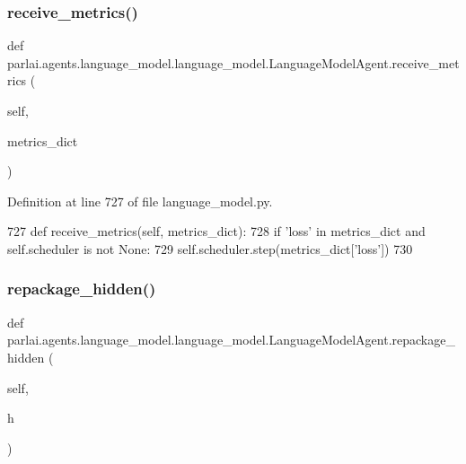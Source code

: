 \subsubsection{\texorpdfstring{receive\+\_\+metrics()}{receive\_metrics()}}
{\footnotesize\ttfamily def parlai.\+agents.\+language\+\_\+model.\+language\+\_\+model.\+Language\+Model\+Agent.\+receive\+\_\+metrics (\begin{DoxyParamCaption}\item[{}]{self,  }\item[{}]{metrics\+\_\+dict }\end{DoxyParamCaption})}



Definition at line 727 of file language\+\_\+model.\+py.


\begin{DoxyCode}
727     \textcolor{keyword}{def }receive\_metrics(self, metrics\_dict):
728         \textcolor{keywordflow}{if} \textcolor{stringliteral}{'loss'} \textcolor{keywordflow}{in} metrics\_dict \textcolor{keywordflow}{and} self.scheduler \textcolor{keywordflow}{is} \textcolor{keywordflow}{not} \textcolor{keywordtype}{None}:
729             self.scheduler.step(metrics\_dict[\textcolor{stringliteral}{'loss'}])
730 
\end{DoxyCode}
\mbox{\label{classparlai_1_1agents_1_1language__model_1_1language__model_1_1LanguageModelAgent_aa54ff09a8edc6ae51ac8be33aeb4acc8}} 
\subsubsection{\texorpdfstring{repackage\+\_\+hidden()}{repackage\_hidden()}}
{\footnotesize\ttfamily def parlai.\+agents.\+language\+\_\+model.\+language\+\_\+model.\+Language\+Model\+Agent.\+repackage\+\_\+hidden (\begin{DoxyParamCaption}\item[{}]{self,  }\item[{}]{h }\end{DoxyParamCaption})}

